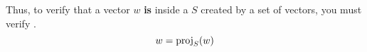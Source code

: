 Thus, to verify that a vector $w$ \textbf{is} inside a  $S$ created by a set of vectors, you must verify .
\begin{equation}\label{eq:Verify_Vector_In_Span}
  w = \Proj{w}{S}
\end{equation}


